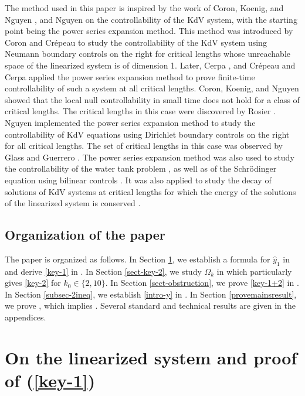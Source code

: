 \documentclass[11pt, reqno]{amsart}
\theoremstyle{plain}
\numberwithin{equation}{section}
\begin{document}
The method used in this paper is inspired by the work of Coron, Koenig, and Nguyen \cite{Coron-Koenig-Nguyen}, and Nguyen \cite{Nguyen} on the controllability of the KdV system, with the starting point being the power series expansion method. This method was introduced by Coron and Cr\'epeau \cite{Coron-Crepeau} to study the controllability of the KdV system using Neumann boundary controls on the right for critical lengths whose unreachable space of the linearized system is of dimension 1. Later,  Cerpa \cite{Cerpa07}, and Cr\'epeau and Cerpa \cite{CC09} applied the power series expansion method to prove finite-time controllability of such a system at all critical lengths. Coron, Koenig, and Nguyen \cite{Coron-Koenig-Nguyen} showed that the local null controllability in small time does not hold for a class of critical lengths. The critical lengths in this case were discovered by Rosier \cite{Rosier97}. Nguyen \cite{Nguyen} implemented the power series expansion method to study the controllability of KdV equations using Dirichlet boundary controls on the right for all critical lengths. The set of critical lengths in this case was observed by Glass and Guerrero \cite{GG10}. The power series expansion method was also used to study the controllability of the water tank problem \cite{Coron-Koenig-Nguyen-WT}, as well as of the Schr\"odinger equation using bilinear controls \cite{BC06, Beauchard08, BM14}. It was also applied to study the decay of solutions of KdV systems at critical lengths for which the energy of the solutions of the linearized system is conserved \cite{Ng-decay}. 

\subsection{Organization of the paper} The paper is organized as follows. In Section \ref{sect-key-1}, we establish a formula for $\hat y_1$ in  and derive \eqref{key-1} in . In Section \ref{sect-key-2}, we study $\Omega_k$ in  which particularly gives \eqref{key-2} for $k_0 \in \{2, 10\}$. In Section \ref{sect-obstruction}, we prove \eqref{key-1+2} in  . In Section \ref{subsec-2ineq}, we establish \eqref{intro-y} in . In Section \ref{provemainsresult}, we prove , which implies . Several standard and technical results are given in the appendices.  


\section{On the linearized system and proof of (\ref{key-1})} \label{sect-key-1}
\end{document}
